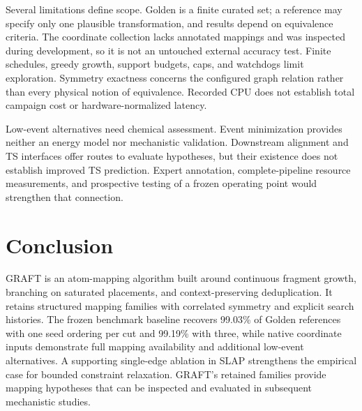 Several limitations define scope. Golden is a finite curated set; a reference may specify only one plausible transformation, and results depend on equivalence criteria. The coordinate collection lacks annotated mappings and was inspected during development, so it is not an untouched external accuracy test. Finite schedules, greedy growth, support budgets, caps, and watchdogs limit exploration. Symmetry exactness concerns the configured graph relation rather than every physical notion of equivalence. Recorded CPU does not establish total campaign cost or hardware-normalized latency.

Low-event alternatives need chemical assessment. Event minimization provides neither an energy model nor mechanistic validation. Downstream alignment and TS interfaces offer routes to evaluate hypotheses, but their existence does not establish improved TS prediction. Expert annotation, complete-pipeline resource measurements, and prospective testing of a frozen operating point would strengthen that connection.

\section{Conclusion}

GRAFT is an atom-mapping algorithm built around continuous fragment growth, branching on saturated placements, and context-preserving deduplication. It retains structured mapping families with correlated symmetry and explicit search histories. The frozen benchmark baseline recovers 99.03\% of Golden references with one seed ordering per cut and 99.19\% with three, while native coordinate inputs demonstrate full mapping availability and additional low-event alternatives. A supporting single-edge ablation in SLAP strengthens the empirical case for bounded constraint relaxation. GRAFT's retained families provide mapping hypotheses that can be inspected and evaluated in subsequent mechanistic studies.
